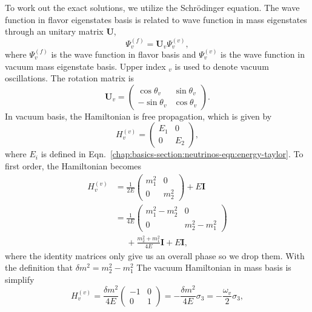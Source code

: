 To work out the exact solutions, we utilize the Schr\"{o}dinger equation. The wave function in flavor eigenstates basis is related to wave function in mass eigenstates through an unitary matrix $\mathbf U$,
\begin{equation}
\Psi_{v}^{(f)} = \mathbf{U}_{v}\Psi_{v}^{(v)},
\end{equation}
where $\Psi_{v}^{(f)}$ is the wave function in flavor basis and $\Psi_{v}^{(v)}$ is the wave function in vacuum mass eigenstate basis. Upper index ${}_{v}$ is used to denote vacuum oscillations. The rotation matrix is
\begin{equation}
\mathbf{U}_{v} = \begin{pmatrix} \cos\theta_v & \sin \theta_v \\ -\sin \theta_v & \cos \theta_v \end{pmatrix}.
\end{equation}
In vacuum basis, the Hamiltonian is free propagation, which is given by
\begin{equation}
H_v^{(v)} = \begin{pmatrix} E_1 & 0 \\
0 & E_2
\end{pmatrix},
\end{equation}
where $E_i$ is defined in Eqn.~\ref{chap:basics-section:neutrinos-eqn:energy-taylor}.
To first order, the Hamiltonian becomes
\begin{align*}
H_v^{(v)} &= \frac{1}{2E} \begin{pmatrix}
m_1^2 & 0 \\
0 & m_2^2
\end{pmatrix} + E \mathbf{I}\\
& =  \frac{1}{4E} \begin{pmatrix}
m_1^2 - m_2^2 & 0 \\
0 & m_2^2 - m_1^2
\end{pmatrix} \\
&\phantom{=}+ \frac{m_2^2 + m_1^2}{4E} \mathbf{I} + E \mathbf{I},
\end{align*}
where the identity matrices only give us an overall phase so we drop them. With the definition that $\delta m^2 = m_2^2 - m_1^2$ The vacuum Hamiltonian in mass basis is simplify
\begin{equation}
H_v^{(v)} =  \frac{\delta m^2}{4E} \begin{pmatrix}
-1 & 0 \\
0 & 1
\end{pmatrix} = -\frac{\delta m^2}{4E} \sigma_3 = -\frac{\omega_{v}}{2}\sigma_3 ,
\end{equation}
